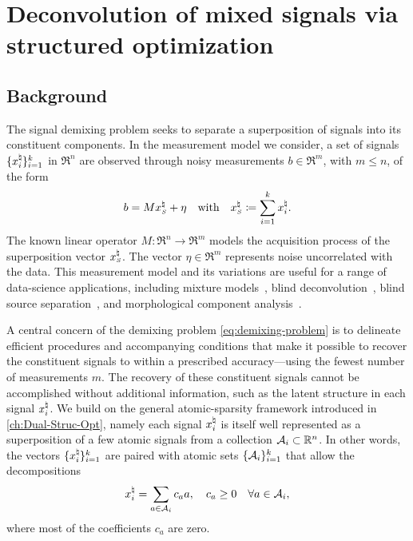 \chapter{Deconvolution of mixed signals via structured optimization}
\label{ch:App-Sig-Demix}

\section{Background} 

The signal demixing problem seeks to separate a superposition of signals into its constituent components. In the measurement model we consider, a set of signals $\{x_i^{\natural}\}_{i=1}^k$ in $\Re^n$ are observed through noisy
measurements $b\in\Re^m$, with $m\le n$, of the form
\begin{equation}\label{eq:demixing-problem}
  b = Mx_{\scriptscriptstyle S}^\natural + \eta \hbox{\quad with\quad} x_{\scriptscriptstyle S}^\natural\coloneqq \sum\limits_{i = 1}^k x_i^{\natural}.
\end{equation}
The known linear operator $M:\Re^n \rightarrow \Re^m$ models the acquisition process of the superposition vector $x_{\scriptscriptstyle S}^\natural$. The vector $\eta\in \Re^m$ represents noise uncorrelated with the data. This measurement model and its variations are useful for a range of data-science applications, including mixture models~\cite{araki2009blind,quiros2012dependent}, blind deconvolution~\cite{ahmed2013blind}, blind source separation~\cite{chan2008convex}, and morphological component analysis~\cite{bobin2007morphological}.

A central concern of the demixing problem \eqref{eq:demixing-problem} is to delineate efficient procedures and accompanying conditions that make it possible to recover the constituent signals to within a prescribed accuracy---using the fewest number of measurements $m$. The recovery of these constituent signals cannot be accomplished without additional information, such as the latent structure in each signal $x_i^{\natural}$. We build on the general atomic-sparsity framework introduced in \autoref{ch:Dual-Struc-Opt}, namely each signal $x_i^{\natural}$ is itself well represented as a superposition of a few atomic signals from a collection  $\mathcal{A}_i\subset\mathbb{R}^n$. In other words, the vectors $\{x_i^{\natural}\}_{i=1}^k$ are paired with atomic sets $\{\mathcal{A}_i\}_{i=1}^k$ that allow the decompositions
\begin{equation} \label{eq:decomposition}
  x_i^{\natural} = \sum_{a\in \mathcal{A}_i}c_a a, \quad c_a\geq 0\quad \forall a \in \mathcal{A}_i,
\end{equation}
where most of the coefficients $c_a$ are zero.

